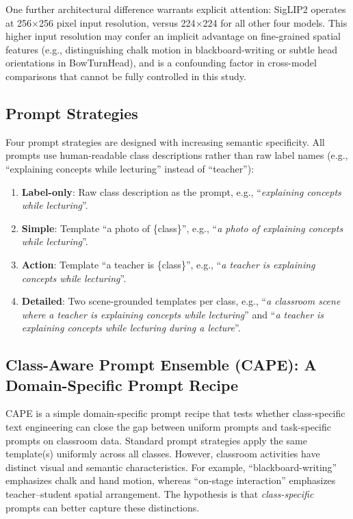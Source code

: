 \documentclass[symmetry,article,submit,pdftex,moreauthors]{Definitions/mdpi}
\begin{document}
One further architectural difference warrants explicit attention: SigLIP2 operates at 256$\times$256 pixel input resolution, versus 224$\times$224 for all other four models. This higher input resolution may confer an implicit advantage on fine-grained spatial features (e.g., distinguishing chalk motion in blackboard-writing or subtle head orientations in BowTurnHead), and is a confounding factor in cross-model comparisons that cannot be fully controlled in this study.

\subsection{Prompt Strategies}
\label{sec:prompts}

Four prompt strategies are designed with increasing semantic specificity.
All prompts use human-readable class descriptions rather than raw label names (e.g., ``explaining concepts while lecturing'' instead of ``teacher''):

\begin{enumerate}
    \item \textbf{Label-only}: Raw class description as the prompt, e.g., ``\textit{explaining concepts while lecturing}''.
    \item \textbf{Simple}: Template ``a photo of \{class\}'', e.g., ``\textit{a photo of explaining concepts while lecturing}''.
    \item \textbf{Action}: Template ``a teacher is \{class\}'', e.g., ``\textit{a teacher is explaining concepts while lecturing}''.
    \item \textbf{Detailed}: Two scene-grounded templates per class, e.g., ``\textit{a classroom scene where a teacher is explaining concepts while lecturing}'' and ``\textit{a teacher is explaining concepts while lecturing during a lecture}''.
\end{enumerate}

\subsection{Class-Aware Prompt Ensemble (CAPE): A Domain-Specific Prompt Recipe}
\label{sec:cape}

CAPE is a simple domain-specific prompt recipe that tests whether class-specific text engineering can close the gap between uniform prompts and task-specific prompts on classroom data.
Standard prompt strategies apply the same template(s) uniformly across all classes.
However, classroom activities have distinct visual and semantic characteristics.
For example, ``blackboard-writing'' emphasizes chalk and hand motion, whereas ``on-stage interaction'' emphasizes teacher--student spatial arrangement.
The hypothesis is that \emph{class-specific} prompts can better capture these distinctions.
\end{document}
